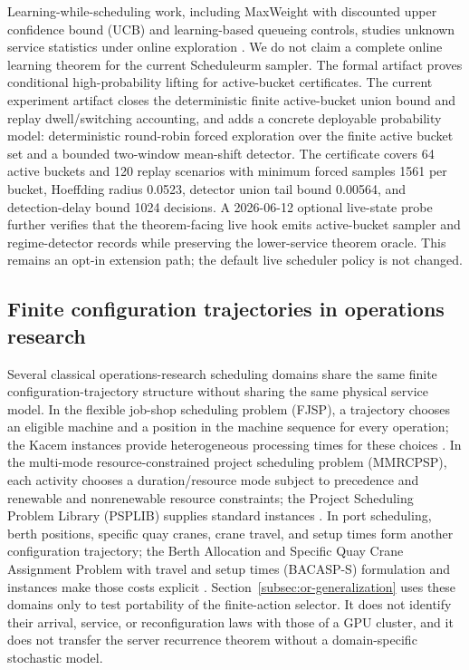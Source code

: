 \documentclass[opre,dblanonrev]{informs4}
\begin{document}
Learning-while-scheduling work, including MaxWeight with discounted upper
confidence bound (UCB) and learning-based queueing controls, studies unknown
service statistics under online exploration
\citep{yang2023maxweight,liu2020rlqn,dai2022deep}.  We do not claim a complete
online learning theorem for the current Scheduleurm sampler.  The formal
artifact proves conditional high-probability lifting for active-bucket
certificates.  The current experiment artifact closes the deterministic finite
active-bucket union bound and replay dwell/switching accounting, and adds a
concrete deployable probability model: deterministic round-robin forced
exploration over the finite active bucket set and a bounded two-window
mean-shift detector.  The certificate covers 64 active buckets and 120 replay
scenarios with minimum forced samples 1561 per bucket, Hoeffding radius 0.0523,
detector union tail bound 0.00564, and detection-delay bound 1024 decisions.  A
2026-06-12 optional live-state probe further verifies that the theorem-facing
live hook emits active-bucket sampler and regime-detector records while
preserving the lower-service theorem oracle.  This remains an opt-in extension
path; the default live scheduler policy is not changed.

\subsection{Finite configuration trajectories in operations research}
\label{subsec:related-trajectories}

Several classical operations-research scheduling domains share the same finite
configuration-trajectory structure without sharing the same physical service
model.  In the flexible job-shop scheduling problem (FJSP), a trajectory chooses
an eligible machine and a position in the machine sequence for every operation;
the Kacem instances provide heterogeneous processing times for these choices
\citep{kacem2002pareto}.  In the multi-mode resource-constrained project
scheduling problem (MMRCPSP), each activity chooses a duration/resource mode
subject to precedence and renewable and nonrenewable resource constraints; the
Project Scheduling Problem Library (PSPLIB) supplies standard instances
\citep{kolisch1997psplib}.  In port scheduling, berth positions, specific quay
cranes, crane travel, and setup times form another configuration trajectory;
the Berth Allocation and Specific Quay Crane Assignment Problem with travel and
setup times (BACASP-S) formulation and instances make those costs explicit
\citep{correcher2024berth}.  Section~\ref{subsec:or-generalization} uses these
domains only to test portability of the finite-action selector.  It does not
identify their arrival, service, or reconfiguration laws with those of a GPU
cluster, and it does not transfer the server recurrence theorem without a
domain-specific stochastic model.
\end{document}
